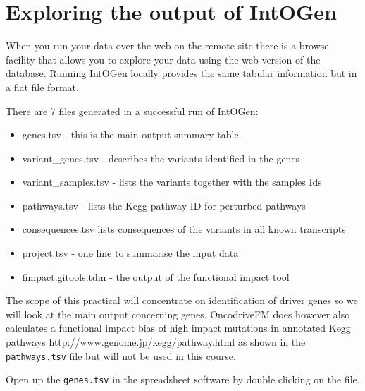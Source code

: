 \section{Exploring the output of IntOGen}

\begin{information}
When you run your data over the web on the remote site there is a browse facility that
allows you to explore your data using the web version of the database. Running IntOGen locally
provides the same tabular information but in a flat file format.
\end{information}

\begin{information}
There are 7 files generated in a successful run of IntOGen:
\begin{itemize}
 \item genes.tsv - this is the main output summary table.
 \item variant\_genes.tsv - describes the variants identified in the genes
 \item variant\_samples.tsv - lists the variants together with the samples Ids
 \item pathways.tsv - lists the Kegg pathway ID for perturbed pathways
 \item consequences.tsv \- lists consequences of the variants in all known transcripts
 \item project.tsv - one line to summarise the input data
 \item fimpact.gitools.tdm - the output of the functional impact tool
\end{itemize}
\end{information}

The scope of this practical will concentrate on identification of driver genes so we
will look at the main output concerning genes. OncodriveFM does however also
calculates a functional impact bias of high impact mutations in annotated Kegg
pathways \url{http://www.genome.jp/kegg/pathway.html} as shown in the
\texttt{pathways.tsv} file but will not be used in this course.

\begin{steps}
Open up the \texttt{genes.tsv} in the spreadsheet software by double clicking on the file.
\end{steps}

